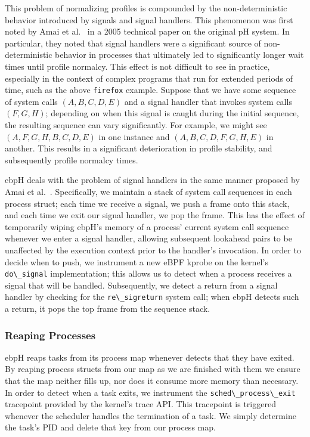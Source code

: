 \documentclass[
  12pt]{findlay}
\begin{document}
This problem of normalizing profiles is compounded by the
non-deterministic behavior introduced by signals and signal handlers.
This phenomenon was first noted by Amai et al.~\autocite{amai05} in a
2005 technical paper on the original pH system. In particular, they
noted that signal handlers were a significant source of
non-deterministic behavior in processes that ultimately led to
significantly longer wait times until profile normalcy. This effect is
not difficult to see in practice, especially in the context of complex
programs that run for extended periods of time, such as the above
\passthrough{\lstinline!firefox!} example. Suppose that we have some
sequence of system calls \((A, B, C, D, E)\) and a signal handler that
invokes system calls \((F, G, H)\); depending on when this signal is
caught during the initial sequence, the resulting sequence can vary
significantly. For example, we might see \((A, F, G, H, B, C, D, E)\) in
one instance and \((A, B, C, D, F, G, H, E)\) in another. This results
in a significant deterioration in profile stability, and subsequently
profile normalcy times.

ebpH deals with the problem of signal handlers in the same manner
proposed by Amai et al.~\autocite{amai05}. Specifically, we maintain a
stack of system call sequences in each process struct; each time we
receive a signal, we push a frame onto this stack, and each time we exit
our signal handler, we pop the frame. This has the effect of temporarily
wiping ebpH's memory of a process' current system call sequence whenever
we enter a signal handler, allowing subsequent lookahead pairs to be
unaffected by the execution context prior to the handler's invocation.
In order to decide when to push, we instrument a new eBPF kprobe on the
kernel's \passthrough{\lstinline!do\_signal!} implementation; this
allows us to detect when a process receives a signal that will be
handled. Subsequently, we detect a return from a signal handler by
checking for the \passthrough{\lstinline!re\_sigreturn!} system call;
when ebpH detects such a return, it pops the top frame from the sequence
stack.

\hypertarget{reaping-processes}{%
\subsubsection{Reaping Processes}\label{reaping-processes}}

ebpH reaps tasks from its process map whenever detects that they have
exited. By reaping process structs from our map as we are finished with
them we ensure that the map neither fills up, nor does it consume more
memory than necessary. In order to detect when a task exits, we
instrument the \passthrough{\lstinline!sched\_process\_exit!} tracepoint
provided by the kernel's trace API. This tracepoint is triggered
whenever the scheduler handles the termination of a task. We simply
determine the task's PID and delete that key from our process map.
\end{document}
